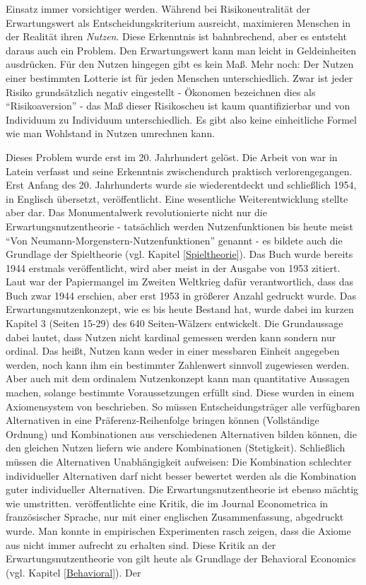Einsatz immer vorsichtiger werden. Während bei Risikoneutralität der Erwartungswert als Entscheidungskriterium ausreicht, maximieren Menschen in der Realität ihren \textit{Nutzen}. Diese Erkenntnis ist bahnbrechend, aber es entsteht daraus auch ein Problem. Den Erwartungswert kann man leicht in Geldeinheiten ausdrücken. Für den Nutzen hingegen gibt es kein Maß. Mehr noch: Der Nutzen einer bestimmten Lotterie ist für jeden Menschen unterschiedlich. Zwar ist jeder Risiko grundsätzlich negativ eingestellt - Ökonomen bezeichnen dies als "`Risikoaversion"' - das Maß dieser Risikoscheu ist kaum quantifizierbar und von Individuum zu Individuum unterschiedlich. Es gibt also keine einheitliche Formel wie man Wohlstand in Nutzen umrechnen kann. 

Dieses Problem wurde erst im 20. Jahrhundert gelöst. Die Arbeit von \textcite{Bernoulli1738} war in Latein verfasst und seine Erkenntnis zwischendurch praktisch verlorengegangen. Erst Anfang des 20. Jahrhunderts wurde sie wiederentdeckt und schließlich 1954, in Englisch übersetzt, veröffentlicht. Eine wesentliche Weiterentwicklung stellte aber \textcite{Morgenstern1944} dar. Das Monumentalwerk revolutionierte nicht nur die Erwartungsnutzentheorie - tatsächlich werden Nutzenfunktionen bis heute meist "`Von Neumann-Morgenstern-Nutzenfunktionen"' genannt - es bildete auch die Grundlage der Spieltheorie (vgl. Kapitel \ref{Spieltheorie}). Das Buch wurde bereits 1944 erstmals veröffentlicht, wird aber meist in der Ausgabe von 1953 zitiert. Laut \textcite[S. 235]{Bernstein1996} war der Papiermangel im Zweiten Weltkrieg dafür verantwortlich, dass das Buch zwar 1944 erschien, aber erst 1953 in größerer Anzahl gedruckt wurde. Das Erwartungsnutzenkonzept, wie es bis heute Bestand hat, wurde dabei im kurzen Kapitel 3 (Seiten 15-29) des 640 Seiten-Wälzers entwickelt. Die Grundaussage dabei lautet, dass Nutzen nicht kardinal gemessen werden kann sondern nur ordinal. Das heißt, Nutzen kann weder in einer messbaren Einheit angegeben werden, noch kann ihm ein bestimmter Zahlenwert sinnvoll zugewiesen werden. Aber auch mit dem ordinalem Nutzenkonzept kann man quantitative Aussagen machen, solange bestimmte Voraussetzungen erfüllt sind. Diese wurden in einem Axiomensystem von \textcite[S. 26f]{Morgenstern1944} beschrieben. So müssen Entscheidungsträger alle verfügbaren Alternativen in eine Präferenz-Reihenfolge bringen können (Vollständige Ordnung) und Kombinationen aus verschiedenen Alternativen bilden können, die den gleichen Nutzen liefern wie andere Kombinationen (Stetigkeit). Schließlich müssen die Alternativen Unabhängigkeit aufweisen: Die Kombination schlechter individueller Alternativen darf nicht besser bewertet werden als die Kombination guter individueller Alternativen. Die Erwartungsnutzentheorie ist ebenso mächtig wie umstritten. \textcite{Allais1953} veröffentlichte eine Kritik, die im Journal Econometrica in französischer Sprache, nur mit einer englischen Zusammenfassung, abgedruckt wurde. Man konnte in empirischen Experimenten rasch zeigen, dass die Axiome aus \textcite{Morgenstern1944} nicht immer aufrecht zu erhalten sind. Diese Kritik an der Erwartungsnutzentheorie von \textcite{Allais1953} gilt heute als Grundlage der Behavioral Economics (vgl. Kapitel \ref{Behavioral}). Der 